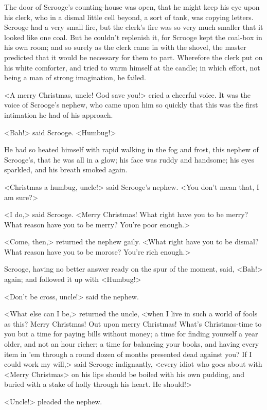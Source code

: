 The door of Scrooge's counting-house was open, that he might keep his eye upon his clerk, who in a dismal little cell beyond, a sort of tank, was copying letters. Scrooge had a very small fire, but the clerk's fire was so very much smaller that it looked like one coal. But he couldn't replenish it, for Scrooge kept the coal-box in his own room; and so surely as the clerk came in with the shovel, the master predicted that it would be necessary for them to part. Wherefore the clerk put on his white comforter, and tried to warm himself at the candle; in which effort, not being a man of strong imagination, he failed.

<A merry Christmas, uncle! God save you!> cried a cheerful voice. It was the voice of Scrooge's nephew, who came upon him so quickly that this was the first intimation he had of his approach.

<Bah!> said Scrooge. <Humbug!>

He had so heated himself with rapid walking in the fog and frost, this nephew of Scrooge's, that he was all in a glow; his face was ruddy and handsome; his eyes sparkled, and his breath smoked again.

<Christmas a humbug, uncle!> said Scrooge's nephew. <You don't mean that, I am sure?>

<I do,> said Scrooge. <Merry Christmas! What right have you to be merry? What reason have you to be merry? You're poor enough.>

<Come, then,> returned the nephew gaily. <What right have you to be dismal? What reason have you to be morose? You're rich enough.>

Scrooge, having no better answer ready on the spur of the moment, said, <Bah!> again; and followed it up with <Humbug!>

<Don't be cross, uncle!> said the nephew.

<What else can I be,> returned the uncle, <when I live in such a world of fools as this? Merry Christmas! Out upon merry Christmas! What's Christmas-time to you but a time for paying bills without money; a time for finding yourself a year older, and not an hour richer; a time for balancing your books, and having every item in 'em through a round dozen of months presented dead against you? If I could work my will,> said Scrooge indignantly, <every idiot who goes about with <Merry Christmas> on his lips should be boiled with his own pudding, and buried with a stake of holly through his heart. He should!>

<Uncle!> pleaded the nephew.

